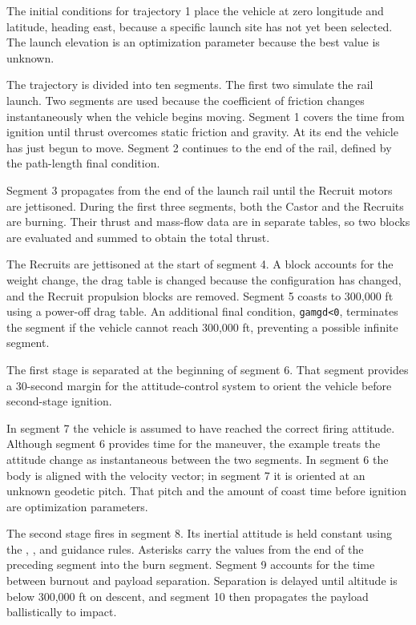 The initial conditions for trajectory 1 place the vehicle at zero longitude and
latitude, heading east, because a specific launch site has not yet been selected.  The
launch elevation is an optimization parameter because the best value is unknown.

The trajectory is divided into ten segments.  The first two simulate the rail launch.
Two segments are used because the coefficient of friction changes instantaneously
when the vehicle begins moving.  Segment 1 covers the time from ignition until
thrust overcomes static friction and gravity.  At its end the vehicle has just begun to
move.  Segment 2 continues to the end of the rail, defined by the path-length final
condition.


Segment 3 propagates from the end of the launch rail until the Recruit motors are
jettisoned.  During the first three segments, both the Castor and the Recruits are
burning.  Their thrust and mass-flow data are in separate tables, so two
 blocks are evaluated and summed to obtain the total thrust.

The Recruits are jettisoned at the start of segment 4.  A
 block accounts for the weight change, the drag table is
changed because the configuration has changed, and the Recruit propulsion blocks
are removed.  Segment 5 coasts to 300,000 ft using a power-off drag table.  An
additional final condition, \texttt{gamgd<0}, terminates the segment if the vehicle
cannot reach 300,000 ft, preventing a possible infinite segment.

The first stage is separated at the beginning of segment 6.  That segment provides a
30-second margin for the attitude-control system to orient the vehicle before
second-stage ignition.


In segment 7 the vehicle is assumed to have reached the correct firing attitude.
Although segment 6 provides time for the maneuver, the example treats the attitude
change as instantaneous between the two segments.  In segment 6 the body is aligned
with the velocity vector; in segment 7 it is oriented at an unknown geodetic pitch.
That pitch and the amount of coast time before ignition are optimization parameters.

The second stage fires in segment 8.  Its inertial attitude is held constant using the
, , and  guidance rules.  Asterisks
carry the values from the end of the preceding segment into the burn segment.
Segment 9 accounts for the time between burnout and payload separation.  Separation
is delayed until altitude is below 300,000 ft on descent, and segment 10 then
propagates the payload ballistically to impact.

